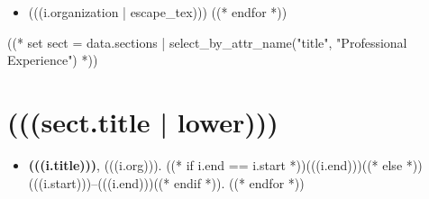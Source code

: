 \documentclass[10pt,oneside]{article}
\begin{document}
\mbox{}\vspace{-\dimexpr\baselineskip\relax}

\begin{itemize}[label={}]
  ((* for i in sect.entries.grantreview | sort(attribute="organization") *))
  \item (((i.organization | escape_tex)))
        ((* endfor *))
\end{itemize}

((* set sect = data.sections | select_by_attr_name("title", "Professional Experience") *))
\section{(((sect.title | lower)))}

\mbox{}\vspace{-\dimexpr\baselineskip\relax}

\begin{itemize}[label={}]
  ((* for i in sect.entries.experience | sort_by_attr(["end", "start"], reverse=True) *))
  \item \textbf{(((i.title)))}, (((i.org))). ((* if i.end == i.start *))(((i.end)))((* else *))(((i.start)))--(((i.end)))((* endif *)).
        ((* endfor *))
\end{itemize}
\end{document}
